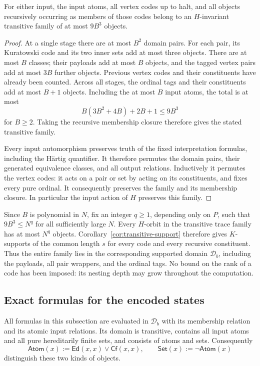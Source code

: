 \begin{lemma}\label{lem:trace-size}
For either input, the input atoms, all vertex codes up to halt, and all
objects recursively occurring as members of those codes belong to an
$H$-invariant transitive family of at most $9B^3$ objects.
\end{lemma}
\begin{proof}
At a single stage there are at most $B^2$ domain pairs. For each pair,
its Kuratowski code and its two inner sets add at most three objects.
There are at most $B$ classes; their payloads add at most $B$ objects,
and the tagged vertex pairs add at most $3B$ further objects. Previous
vertex codes and their constituents have already been counted. Across
all stages, the ordinal tags and their constituents add at most $B+1$
objects. Including the at most $B$ input atoms, the total is at most
\[
 B(3B^2+4B)+2B+1\le 9B^3
\]
for $B\ge2$. Taking the recursive membership closure therefore gives
the stated transitive family.

Every input automorphism preserves truth of the fixed interpretation
formulas, including the H\"artig quantifier. It therefore permutes the
domain pairs, their generated equivalence classes, and all output
relations. Inductively it permutes the vertex codes: it acts on a pair
or set by acting on its constituents, and fixes every pure ordinal.
It consequently preserves the family and its membership closure.
In particular the input action of $H$ preserves this family.
\end{proof}

Since $B$ is polynomial in $N$, fix an integer $q\ge1$, depending only on
$P$, such that $9B^3\le N^q$ for all sufficiently large $N$. Every
$H$-orbit in the transitive trace family has at most $N^q$ objects.
Corollary~\ref{cor:transitive-support} therefore gives $K$-supports of the
common length $s$ for every code and every recursive constituent. Thus
the entire family lies in the corresponding supported domain
$\mathcal D_b$, including the payloads, all pair wrappers, and the ordinal
tags. No bound on the rank of a code has been imposed: its nesting depth
may grow throughout the computation.

\subsection{Exact formulas for the encoded states}

All formulas in this subsection are evaluated in $\mathcal D_b$ with its
membership relation and its atomic input relations. Its domain is
transitive, contains all input atoms and all pure hereditarily finite sets,
and consists of atoms and sets. Consequently
\[
 \mathsf{Atom}(x):=\mathsf{Ed}(x,x)\vee\mathsf{Cf}(x,x),
 \qquad \mathsf{Set}(x):=\neg\mathsf{Atom}(x)
\]
distinguish these two kinds of objects.

